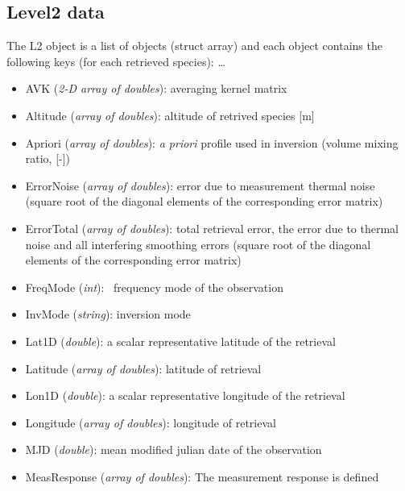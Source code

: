 \subsection{Level2 data}

The L2 object is a list of objects (struct array) and each
object contains the following keys (for each retrieved species):
\dots{}\

\begin{itemize}

    \item AVK (\emph{2-D array of doubles}): averaging kernel matrix 
    \item Altitude (\emph{array of doubles}): altitude of retrived species [m]
    \item Apriori (\emph{array of doubles}): \textit{a priori} profile used in inversion 
    (volume mixing ratio, [-]) 
    \item ErrorNoise (\emph{array of doubles}):  error due to measurement thermal noise
    (square root of the diagonal elements of the corresponding error matrix) 
    \item ErrorTotal (\emph{array of doubles}): total retrieval error,
    the error due to thermal noise and all interfering smoothing errors
    (square root of the diagonal elements of the corresponding error matrix)
    \item FreqMode (\emph{int}): \smr\ frequency mode of the observation
    \item InvMode (\emph{string}): inversion mode 
    \item Lat1D (\emph{double}): a scalar representative latitude of the retrieval
    \item Latitude  (\emph{array of doubles}): latitude of retrieval 
    \item Lon1D (\emph{double}): a scalar representative longitude of the retrieval
    \item Longitude  (\emph{array of doubles}): longitude of retrieval
    \item MJD (\emph{double}): mean modified julian date of the observation
    \item MeasResponse (\emph{array of doubles}): The measurement response is defined 

\end{itemize}
